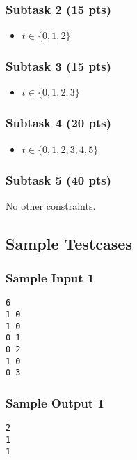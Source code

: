\subsubsection{Subtask 2 (15 pts)}\label{subtask-2}
\begin{itemize}
\item $t\in \{0, 1, 2\}$
\end{itemize}

\subsubsection{Subtask 3 (15 pts)}\label{subtask-3}
\begin{itemize}
\item $t\in \{0, 1, 2, 3\}$
\end{itemize}

\subsubsection{Subtask 4 (20 pts)}\label{subtask-4}
\begin{itemize}
\item $t\in \{0, 1, 2, 3, 4, 5\}$
\end{itemize}

\subsubsection{Subtask 5 (40 pts)}\label{subtask-5}

No other constraints.

\newpage

\subsection{Sample Testcases}\label{sample-testcases}

\begin{multicols}{2}
\subsubsection{Sample Input 1}\label{sample-input-1}
\begin{verbatim}
6
1 0
1 0
0 1
0 2
1 0
0 3
\end{verbatim}

\columnbreak

\subsubsection{Sample Output 1}\label{sample-output-1}
\begin{verbatim}
2
1
1
\end{verbatim}
\end{multicols}


